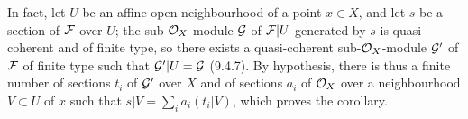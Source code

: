 \documentclass[../main.tex]{subfiles}
\begin{document}
In fact, let $U$ be an affine open neighbourhood of a point $x\in X$, and let $s$ be a section of $\mathcal{F}$ over $U$; the sub-$\mathcal{O}_X$-module $\mathcal{G}$ of $\mathcal{F}|U$ generated by $s$ is quasi-coherent and of finite type, so there exists a quasi-coherent sub-$\mathcal{O}_X$-module $\mathcal{G}'$ of $\mathcal{F}$ of finite type such that $\mathcal{G}'|U=\mathcal{G}$ (9.4.7).
By hypothesis, there is thus a finite number of sections $t_i$ of $\mathcal{G}'$ over $X$ and of sections $a_i$ of $\mathcal{O}_X$ over a neighbourhood $V\subset U$ of $x$ such that $s|V=\sum_i a_i(t_i|V)$, which proves the corollary.
\end{document}
